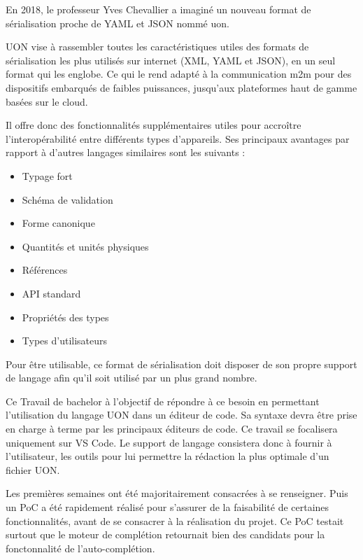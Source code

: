 
En 2018, le professeur Yves Chevallier a imaginé un nouveau format de sérialisation proche de YAML et JSON nommé \Gls{uon}.

UON vise à rassembler toutes les caractéristiques utiles des formats de sérialisation les plus utilisés sur internet (XML, YAML et JSON),
en un seul format qui les englobe. Ce qui le rend adapté à la communication \Gls{m2m} pour des dispositifs embarqués de faibles puissances, jusqu'aux plateformes haut de gamme basées sur le cloud.

Il offre donc des fonctionnalités supplémentaires utiles pour accroître l'interopérabilité entre différents types d'appareils. Ses principaux avantages par rapport à d'autres langages similaires sont les suivants :

\begin{itemize}
    \item Typage fort
    \item Schéma de validation
    \item Forme canonique
    \item Quantités et unités physiques
    \item Références
    \item API standard
    \item Propriétés des types
    \item Types d'utilisateurs
\end{itemize}

Pour être utilisable, ce format de sérialisation doit disposer de son propre support de langage afin qu'il soit utilisé par un plus grand nombre.

Ce Travail de bachelor à l'objectif de répondre à ce besoin en permettant l'utilisation du langage UON dans un éditeur de code.
Sa syntaxe devra être prise en charge à terme par les principaux éditeurs de code. Ce travail se focalisera uniquement sur VS Code.
Le support de langage consistera donc à fournir à l'utilisateur, les outils pour lui permettre la rédaction la plus optimale d'un fichier UON.

Les premières semaines ont été majoritairement consacrées à se renseigner.
Puis un \Gls{PoC} a été rapidement réalisé pour s'assurer de la faisabilité de certaines fonctionnalités, avant de se consacrer à la réalisation du projet.
Ce PoC testait surtout que le moteur de complétion retournait bien des candidats pour la fonctonnalité de l'auto-complétion.

